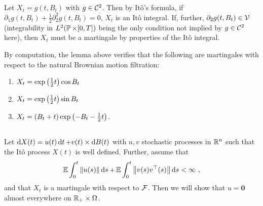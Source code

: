 \documentclass{article}
\begin{document}
    \subsection{} %

    \begin{lemma} Let \(X_t=g(t, B_t)\) with \(g\in\mcC^2\). Then by It\^{o}'s formula, if \(\partial_1g(t, B_t)+\frac{1}{2}\partial_2^2g(t, B_t)=0\), \(X_t\) is an It\^{o} integral. If, further, \(\partial_2 g(t, B_t)\in \mcV\) (integrability in \(L^2(\P\times [0,T])\) being the only condition not implied by \(g\in\mcC^2\) here), then \(X_t\) must be a martingale by properties of the It\^{o} integral.
    \end{lemma}

    By computation, the lemma above verifies that the following are martingales with respect to the natural Brownian motion filtration:

    \begin{enumerate}
    \item \(X_t=\exp\pa{\frac{1}{2}t}\cos B_t\)
    \item \(X_t=\exp\pa{\frac{1}{2}t}\sin B_t\)
    \item \(X_t=(B_t+t)\exp\pa{-B_t-\frac{1}{2}t}\).
    \end{enumerate}

    \subsection{} %
    Let \(\d{X(t)}=u(t)\d{t}+v(t)\times \d{B(t)}\) with \(u,v\) stochastic processes in \(\R^n\) such that the It\^{o} process \(X(t)\) is well defined. Further, assume that
    \[
      \E\int_0^t\norm{u(s)}\d{s}+      \E\int_0^t\norm{v(s)v^\top(s)}\d{s}<\infty\,\,,
    \]
    and that \(X_t\) is a martingale with respect to \(\mcF\). Then we will show that \(u=\textbf{0}\) almost everywhere on \(\R_+\times\Omega\).
\end{document}
